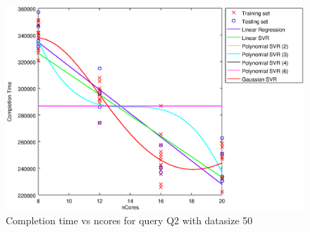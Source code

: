 
\begin {figure}[hbtp]
\centering
\includegraphics[width=\textwidth]{output/Q2_50_ONLY_NCORES/plot_Q2_50.eps}
\caption{Completion time vs ncores for query Q2 with datasize 50}
\label{fig:all_linear_Q2_50}
\end {figure}
